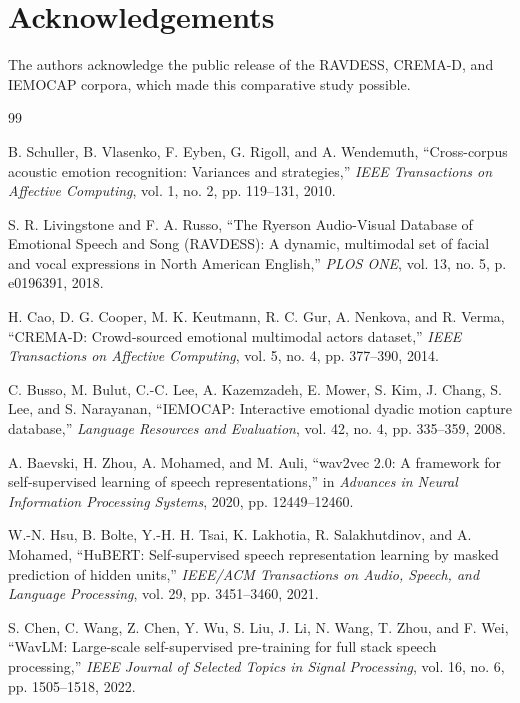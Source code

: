 ﻿\documentclass[10pt,twocolumn,letterpaper]{article}
\begin{document}
\section*{Acknowledgements}
The authors acknowledge the public release of the RAVDESS, CREMA-D, and IEMOCAP corpora, which made this comparative study possible.

\begin{thebibliography}{99}

B. Schuller, B. Vlasenko, F. Eyben, G. Rigoll, and A. Wendemuth,
``Cross-corpus acoustic emotion recognition: Variances and strategies,''
\textit{IEEE Transactions on Affective Computing}, vol. 1, no. 2, pp. 119--131, 2010.

S. R. Livingstone and F. A. Russo,
``The Ryerson Audio-Visual Database of Emotional Speech and Song (RAVDESS): A dynamic, multimodal set of facial and vocal expressions in North American English,''
\textit{PLOS ONE}, vol. 13, no. 5, p. e0196391, 2018.

H. Cao, D. G. Cooper, M. K. Keutmann, R. C. Gur, A. Nenkova, and R. Verma,
``CREMA-D: Crowd-sourced emotional multimodal actors dataset,''
\textit{IEEE Transactions on Affective Computing}, vol. 5, no. 4, pp. 377--390, 2014.

C. Busso, M. Bulut, C.-C. Lee, A. Kazemzadeh, E. Mower, S. Kim, J. Chang, S. Lee, and S. Narayanan,
``IEMOCAP: Interactive emotional dyadic motion capture database,''
\textit{Language Resources and Evaluation}, vol. 42, no. 4, pp. 335--359, 2008.

A. Baevski, H. Zhou, A. Mohamed, and M. Auli,
``wav2vec 2.0: A framework for self-supervised learning of speech representations,''
in \textit{Advances in Neural Information Processing Systems}, 2020, pp. 12449--12460.

W.-N. Hsu, B. Bolte, Y.-H. H. Tsai, K. Lakhotia, R. Salakhutdinov, and A. Mohamed,
``HuBERT: Self-supervised speech representation learning by masked prediction of hidden units,''
\textit{IEEE/ACM Transactions on Audio, Speech, and Language Processing}, vol. 29, pp. 3451--3460, 2021.

S. Chen, C. Wang, Z. Chen, Y. Wu, S. Liu, J. Li, N. Wang, T. Zhou, and F. Wei,
``WavLM: Large-scale self-supervised pre-training for full stack speech processing,''
\textit{IEEE Journal of Selected Topics in Signal Processing}, vol. 16, no. 6, pp. 1505--1518, 2022.


\end{thebibliography}
\end{document}
